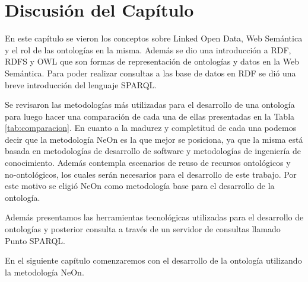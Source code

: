 \section{Discusión del Capítulo}
En este capítulo se vieron los conceptos sobre Linked Open Data, Web Semántica y el rol de las ontologías en la misma. Además se dio una introducción a RDF, RDFS y OWL que son formas de representación de ontologías y datos en la Web Semántica. Para poder realizar consultas a las base de datos en RDF se dió una breve introducción del lenguaje SPARQL.

Se revisaron las metodologías más utilizadas para el desarrollo de una ontología para luego hacer una comparación de cada una de ellas presentadas en la Tabla \ref{tab:comparacion}. En cuanto a la madurez y completitud de cada una podemos decir que la metodología NeOn es la que mejor se posiciona, ya que la misma está basada en metodologías de desarrollo de software y metodologías de ingeniería de conocimiento. Además contempla escenarios de reuso de recursos ontológicos y no-ontológicos, los cuales serán necesarios para el desarrollo de este trabajo. Por este motivo se eligió NeOn como metodología base para el desarrollo de la ontología.

Además presentamos las herramientas tecnológicas utilizadas para el desarrollo de ontologías y posterior consulta a través de un servidor de consultas llamado Punto SPARQL.

En el siguiente capítulo comenzaremos con el desarrollo de la ontología utilizando la metodología NeOn.
